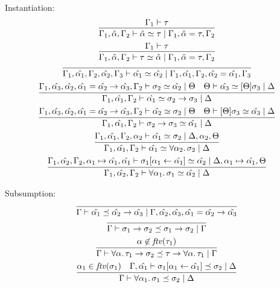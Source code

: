 Instantiation:
\begin{gather*}
  \infer{\Gamma_1, \hat{\alpha}, \Gamma_2 \vdash \hat{\alpha} \simeq \tau \mid \Gamma_1, \hat{\alpha} = \tau, \Gamma_2}{
    \Gamma_1 \vdash \tau
  }
  \\
  \infer{\Gamma_1, \hat{\alpha}, \Gamma_2 \vdash \tau \simeq \hat{\alpha} \mid \Gamma_1, \hat{\alpha} = \tau, \Gamma_2}{
    \Gamma_1 \vdash \tau
  }
  \\
  \infer{\Gamma_1, \hat{\alpha_1}, \Gamma_2, \hat{\alpha_2}, \Gamma_3 \vdash \hat{\alpha_1} \simeq \hat{\alpha_2} \mid \Gamma_1, \hat{\alpha_1}, \Gamma_2, \hat{\alpha_2} = \hat{\alpha_1}, \Gamma_3}{}
  \\
  \infer{\Gamma_1, \hat{\alpha_1}, \Gamma_2 \vdash \hat{\alpha_1} \simeq \sigma_2 \to \sigma_3 \mid \Delta}{
    \Gamma_1, \hat{\alpha_3}, \hat{\alpha_2}, \hat{\alpha_1} = \hat{\alpha_2} \to \hat{\alpha_3}, \Gamma_2 \vdash \sigma_2 \simeq \hat{\alpha_2} \mid \Theta
    &
    \Theta \vdash \hat{\alpha_3} \simeq [\Theta]\sigma_3 \mid \Delta
  }
  \\
  \infer{\Gamma_1, \hat{\alpha_1}, \Gamma_2 \vdash \sigma_2 \to \sigma_3 \simeq \hat{\alpha_1} \mid \Delta}{
    \Gamma_1, \hat{\alpha_3}, \hat{\alpha_2}, \hat{\alpha_1} = \hat{\alpha_2} \to \hat{\alpha_3}, \Gamma_2 \vdash \hat{\alpha_2} \simeq \sigma_2 \mid \Theta
    &
    \Theta \vdash [\Theta]\sigma_3 \simeq \hat{\alpha_3} \mid \Delta
  }
  \\
  \infer{\Gamma_1, \hat{\alpha_1}, \Gamma_2 \vdash \hat{\alpha_1} \simeq \forall \alpha_2\ldotp \sigma_2 \mid \Delta}{
    \Gamma_1, \hat{\alpha_1}, \Gamma_2, \alpha_2 \vdash \hat{\alpha_1} \simeq \sigma_2 \mid \Delta, \alpha_2, \Theta
  }
  \\
  \infer{\Gamma_1, \hat{\alpha_2}, \Gamma_2 \vdash \forall \alpha_1\ldotp \sigma_1 \simeq \hat{\alpha_2} \mid \Delta}{
    \Gamma_1, \hat{\alpha_2}, \Gamma_2, \alpha_1 \mapsto \hat{\alpha_1}, \hat{\alpha_1} \vdash \sigma_1[\alpha_1 \assign \hat{\alpha_1}] \simeq \hat{\alpha_2} \mid \Delta, \alpha_1 \mapsto \hat{\alpha_1}, \Theta
  }
\end{gather*}

Subsumption:
\begin{gather*}
  \infer{\Gamma \vdash \hat{\alpha_1} \preceq \hat{\alpha_2} \to \hat{\alpha_3} \mid \Gamma, \hat{\alpha_2}, \hat{\alpha_3}, \hat{\alpha_1} = \hat{\alpha_2} \to \hat{\alpha_3}}{}
  \\
  \infer{\Gamma \vdash \sigma_1 \to \sigma_2 \preceq \sigma_1 \to \sigma_2 \mid \Gamma}{}
  \\
  \infer{\Gamma \vdash \forall \alpha\ldotp \tau_1 \to \sigma_2 \preceq \tau \to \forall \alpha\ldotp \tau_1 \mid \Gamma}{
    \alpha \not\in \mathit{ftv}(\tau_1)
  }
  \\
  \infer{\Gamma \vdash \forall \alpha_1\ldotp \sigma_1 \preceq \sigma_2 \mid \Delta}{
    \alpha_1 \in \mathit{ftv}(\sigma_1)
    &
    \Gamma, \hat{\alpha_1} \vdash \sigma_1[\alpha_1 \assign \hat{\alpha_1}] \preceq \sigma_2 \mid \Delta
  }
\end{gather*}
